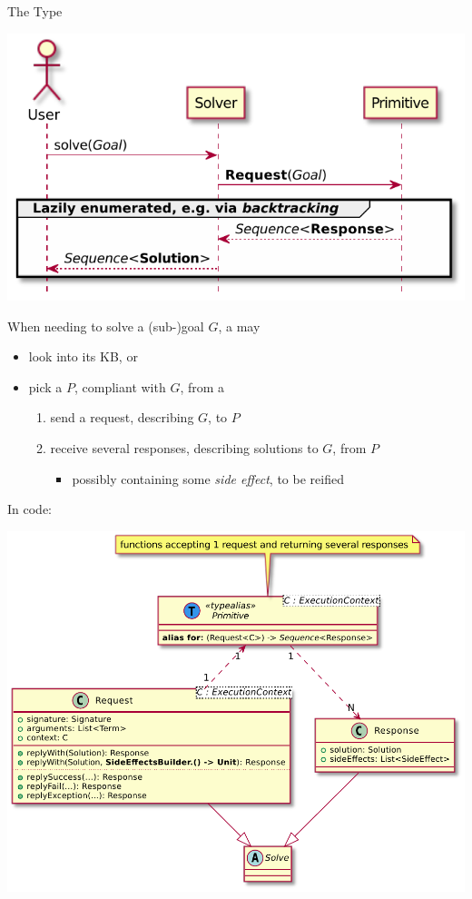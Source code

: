 \documentclass[handout]{beamer}
\begin{document}
\begin{frame}[allowframebreaks]{The  Type}
    \smallskip

    \begin{center}
        \includegraphics[width=.5\linewidth]{img/primitive-usage.pdf}
    \end{center}

    \framebreak

    When needing to solve a (sub-)goal $G$, a  may
    \begin{itemize}
        \item look into its KB, or
        \item pick a  $P$, compliant with $G$, from a 
        \begin{enumerate}
            \item send a \alert{request}, describing $G$, to $P$
            \item receive several \alert{responses}, describing solutions to $G$, from $P$
            \begin{itemize}
                \item possibly containing some \emph{side effect}, to be \alert{reified}
            \end{itemize}
        \end{enumerate}
    \end{itemize}

    \framebreak

    In code:
    \begin{center}
        \includegraphics[width=.5\linewidth]{img/primitive.pdf}
    \end{center}


\end{frame}
\end{document}
